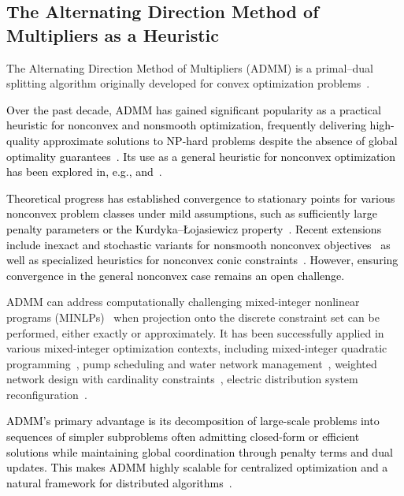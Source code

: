\documentclass[11pt,a4paper]{article}
\theoremstyle{plain}
\theoremstyle{definition}
\theoremstyle{remark}
\newcommand{\ym}[1]{\textcolor{black}{#1}}
\begin{document}
	\subsection{The Alternating Direction Method of Multipliers as a Heuristic}
	
	The Alternating Direction Method of Multipliers (ADMM) is a primal--dual splitting algorithm originally developed for convex optimization problems~\cite{Boyd1,Bertsekas:book16:NLProg}.
	
	\ym{Over the past decade, ADMM has gained significant popularity as a practical heuristic for nonconvex and nonsmooth optimization, frequently delivering high-quality approximate solutions to NP-hard problems despite the absence of global optimality guarantees~\cite{boyd2011distributed,hong2016convergence,wang2019global}. Its use as a general heuristic for nonconvex optimization has been explored in, e.g., \cite[Ch.~9]{Boyd1} and~\cite{derbinsky2013improved}}.
	
	\ym{Theoretical progress has established convergence to stationary points for various nonconvex problem classes under mild assumptions, such as sufficiently large penalty parameters or the Kurdyka--Łojasiewicz property~\cite{hong2016convergence,wang2019global,yuan2024admm}. Recent extensions include inexact and stochastic variants for nonsmooth nonconvex objectives~\cite{bai2024inexact} as well as specialized heuristics for nonconvex conic constraints~\cite{alzalg2025admm}. However, ensuring convergence in the general nonconvex case remains an open challenge.}
	
	ADMM can address computationally challenging mixed-integer nonlinear programs (MINLPs)~\cite{boyd-biconvex} when projection onto the discrete constraint set can be performed, either exactly or approximately. It has been successfully applied in various mixed-integer optimization contexts, including mixed-integer quadratic programming~\cite{takapoui2020simple}, pump scheduling and water network management~\cite{fooladivanda2017energy}, weighted network design with cardinality constraints~\cite{sun2018weighted}, electric distribution system reconfiguration~\cite{shen2019distributed,mokhtari2025alternating,mokhtari2025distributed}.
	
	\ym{ADMM's primary advantage is its decomposition of large-scale problems into sequences of simpler subproblems often admitting closed-form or efficient solutions while maintaining global coordination through penalty terms and dual updates. This makes ADMM highly scalable for centralized optimization and a natural framework for distributed algorithms~\cite{Boyd1,yang2019survey,molzahn2017survey,forero2010consensus,huang2016consensus}.}
	
\end{document}
